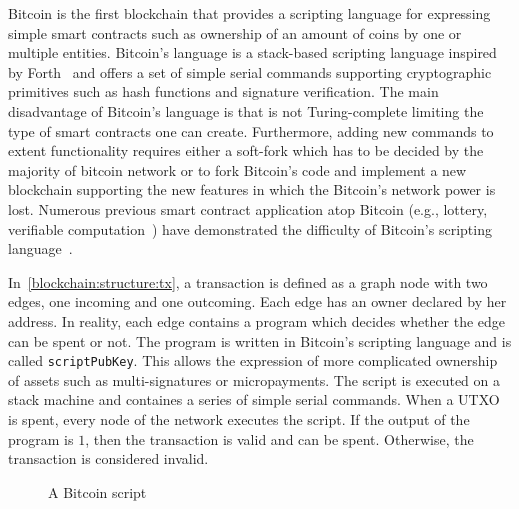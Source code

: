 Bitcoin is the first blockchain that provides a scripting language for expressing simple smart contracts such as ownership of an amount of coins by one or multiple entities. Bitcoin's language is a stack-based scripting language inspired by Forth~\cite{forth_lang} and offers a set of simple serial commands supporting cryptographic primitives such as hash functions and signature verification. The main disadvantage of Bitcoin's language is that is not Turing-complete limiting the type of smart contracts one can create. Furthermore, adding new commands to extent functionality requires either a soft-fork which has to be decided by the majority of bitcoin network or to fork Bitcoin's code and implement a new blockchain supporting the new features in which the Bitcoin's network power is lost. Numerous previous smart contract application atop Bitcoin (e.g., lottery\cite{Andrychowicz:2014:SMC:2650286.2650764,10.1007/978-3-662-44381-1_24}, verifiable computation~\cite{Kumaresan:2014:UBI:2660267.2660380}) have demonstrated the difficulty of Bitcoin's scripting language~\cite{cryptoeprint:2015:675}.

In~\ref{blockchain:structure:tx}, a transaction is defined as a graph node with two edges, one incoming and one outcoming. Each edge has an owner declared by her address. In reality, each edge contains a program which decides whether the edge can be spent or not. The program is written in Bitcoin's scripting language and is called \verb|scriptPubKey|. This allows the expression of more complicated ownership of assets such as multi-signatures or micropayments. The script is executed on a stack machine and containes a series of simple serial commands. When a UTXO is spent, every node of the network executes the script. If the output of the program is $1$, then the transaction is valid and can be spent. Otherwise, the transaction is considered invalid.

\begin{figure}[!ht]
  \centering
  \caption{A Bitcoin script}
  \label{fig:bl_tx:script}
\end{figure}

